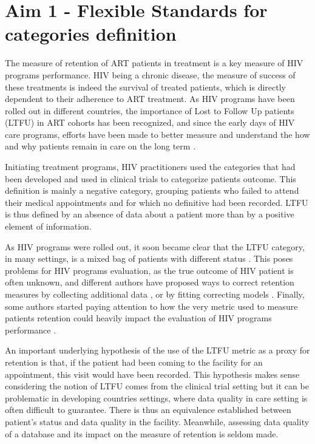 \section[Flexible Standards]{Aim 1 - Flexible Standards for categories definition}

The measure of retention of ART patients in treatment is a key measure of HIV programs performance. HIV being a chronic disease, the measure of success of these treatments is indeed the survival of treated patients, which is directly dependent to their adherence to ART treatment. As HIV programs have been rolled out in different countries, the importance of Lost to Follow Up patients (LTFU) in ART cohorts has been recognized, and since the early days of HIV care programs, efforts have been made to better measure and understand the how and why patients remain in care on the long term   \citep{ioannidis_predictors_1999,lebouche_incidence_2006,moh_incidence_2007}.

Initiating treatment programs, HIV practitioners used the categories that had been developed and used in clinical trials to categorize patients outcome. This definition is mainly a negative category, grouping patients who failed to attend their medical appointments and for which no definitive had been recorded. LTFU is thus defined by an absence of data about a patient more than by a positive element of information.

As HIV programs were rolled out, it soon became clear that the LTFU category, in many settings, is a mixed bag of patients with different status \citep{kwong-leung_yu_true_2007,dalal_characteristics_2008,mcguire_vital_2010}. This poses problems for HIV programs evaluation, as the true outcome of HIV patient is often unknown, and different authors have proposed ways to correct retention measures by collecting additional data
 \citep{yiannoutsos_sampling-based_2008,geng_tracking_2010,tassie_evaluation_2010}, or by fitting correcting models \citep{brinkhof_adjusting_2010,egger_correcting_2011,van_cutsem_correcting_2011,henriques_comparison_2012,verguet_incorporating_2013}.
Finally, some authors started paying attention to how the very metric used to measure patients retention could heavily impact the evaluation of HIV programs performance \citep{chi_empirical_2010,chi_universal_2011,fox_defining_2012,mugavero_measuring_2012,yehia_comparing_2012,grimsrud_impact_2013,shepherd_impact_2013}.

An important underlying hypothesis of the use of the LTFU metric as a proxy for retention is that, if the patient had been coming to the facility for an appointment, this visit would have been recorded. This hypothesis makes sense considering the notion of LTFU comes from the clinical trial setting \citep{lebouche_incidence_2006} but it can be problematic in developing countries settings, where data quality in care setting is often difficult to guarantee. There is thus an equivalence established between patient's status and data quality in the facility. Meanwhile, assessing data quality of a database and its impact on the measure of retention is seldom made. %

